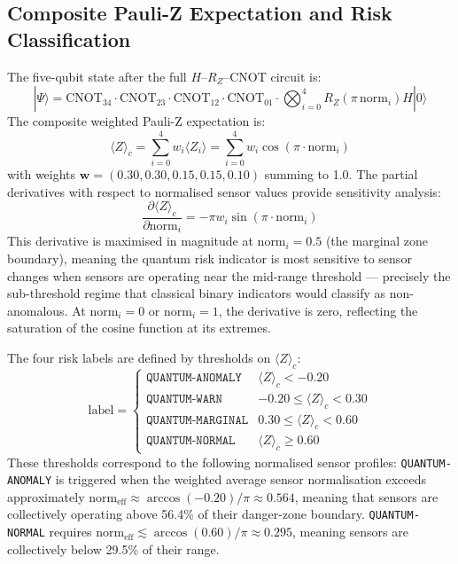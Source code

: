 \subsection{Composite Pauli-Z Expectation and Risk Classification}

The five-qubit state after the full $H$--$R_Z$--CNOT circuit is:
\begin{equation}
    |\Psi\rangle = \text{CNOT}_{34} \cdot \text{CNOT}_{23} \cdot \text{CNOT}_{12} \cdot \text{CNOT}_{01}
    \cdot \bigotimes_{i=0}^{4} R_Z(\pi\,\text{norm}_i) H |0\rangle
    \label{eq:full_circuit_state}
\end{equation}
The composite weighted Pauli-Z expectation is:
\begin{equation}
    \langle Z \rangle_c = \sum_{i=0}^{4} w_i \langle Z_i \rangle = \sum_{i=0}^{4} w_i \cos(\pi \cdot \text{norm}_i)
    \label{eq:composite_z_full}
\end{equation}
with weights $\mathbf{w} = (0.30, 0.30, 0.15, 0.15, 0.10)$ summing to 1.0. The partial derivatives with respect to normalised sensor values provide sensitivity analysis:
\begin{equation}
    \frac{\partial \langle Z \rangle_c}{\partial \text{norm}_i} = -\pi w_i \sin(\pi \cdot \text{norm}_i)
    \label{eq:z_sensitivity}
\end{equation}
This derivative is maximised in magnitude at $\text{norm}_i = 0.5$ (the marginal zone boundary), meaning the quantum risk indicator is most sensitive to sensor changes when sensors are operating near the mid-range threshold --- precisely the sub-threshold regime that classical binary indicators would classify as non-anomalous. At $\text{norm}_i = 0$ or $\text{norm}_i = 1$, the derivative is zero, reflecting the saturation of the cosine function at its extremes.

The four risk labels are defined by thresholds on $\langle Z \rangle_c$:
\begin{equation}
    \text{label} = \begin{cases}
        \texttt{QUANTUM-ANOMALY}  & \langle Z \rangle_c < -0.20 \\
        \texttt{QUANTUM-WARN}     & -0.20 \leq \langle Z \rangle_c < 0.30 \\
        \texttt{QUANTUM-MARGINAL} & 0.30 \leq \langle Z \rangle_c < 0.60 \\
        \texttt{QUANTUM-NORMAL}   & \langle Z \rangle_c \geq 0.60
    \end{cases}
    \label{eq:risk_labels}
\end{equation}
These thresholds correspond to the following normalised sensor profiles: \texttt{QUANTUM-ANOMALY} is triggered when the weighted average sensor normalisation exceeds approximately $\text{norm}_{\text{eff}} \approx \arccos(-0.20)/\pi \approx 0.564$, meaning that sensors are collectively operating above 56.4\% of their danger-zone boundary. \texttt{QUANTUM-NORMAL} requires $\text{norm}_{\text{eff}} \lesssim \arccos(0.60)/\pi \approx 0.295$, meaning sensors are collectively below 29.5\% of their range.

